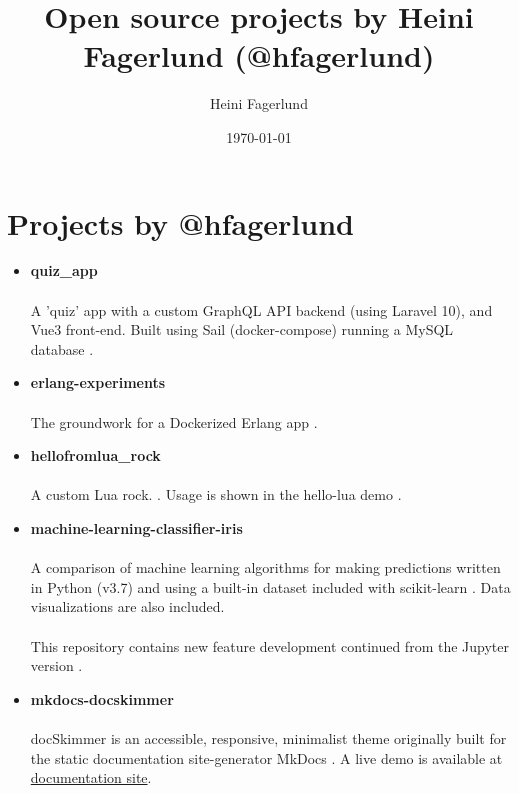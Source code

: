 \documentclass[11pt]{article}
\author{Heini Fagerlund}
\date{\today}
\title{Open source projects by Heini Fagerlund (@hfagerlund)}
\begin{document}
\maketitle

\section{Projects by @hfagerlund}
\label{sec:orge9eef1b}
\begin{itemize}
\item \textbf{quiz\_app}
\paragraph{}
A 'quiz' app with a custom GraphQL API backend (using Laravel 10), and Vue3 front-end. Built using Sail (docker-compose) running a MySQL database \cite{quiz-app}.
\item \textbf{erlang-experiments}
\paragraph{}
The groundwork for a Dockerized Erlang app \cite{erlang}.
\item \textbf{hellofromlua\_rock}
\paragraph{}
A custom Lua rock. \cite{luarock}. Usage is shown in the hello-lua demo \cite{lua}.
\item \textbf{machine-learning-classifier-iris}
\paragraph{}
A comparison of machine learning algorithms for making predictions written in Python (v3.7) and using a built-in dataset included with scikit-learn \cite{machinelearning}. Data visualizations are also included.
 \paragraph{}
This repository contains new feature development continued from the Jupyter version \cite{jupyter}.
\item \textbf{mkdocs-docskimmer}
\paragraph{}
docSkimmer is an accessible, responsive, minimalist theme originally built for the static documentation site-generator MkDocs \cite{mkdocs-docskimmer}. A live demo is available at \href{http://bitsof.bytesofdesign.com/mkdocs-docskimmer/}{documentation site}.

\end{itemize}
\end{document}
